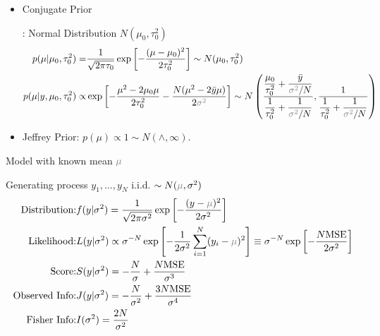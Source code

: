 \begin{itemize}[topsep=2pt,itemsep=0pt]
    \item \hypertarget{NormalWithVarConjugate}{Conjugate Prior}: Normal Distribution $ N(\mu _0,\tau_0^2) $
    \begin{align*}
        p(\mu |\mu _0,\tau_0^2)=&\dfrac{ 1 }{ \sqrt{2\pi\tau_0} }\exp\left[ -\dfrac{ (\mu -\mu _0)^2 }{ 2\tau_0^2 }  \right]\sim N(\mu _0,\tau_0^2) \\
        p(\mu |y,\mu _0,\tau_0^2)\propto&\exp\left[ -\dfrac{ \mu ^2-2\mu _0\mu  }{ 2\tau_0^2 }-\dfrac{ N(\mu ^2-2\bar{y}\mu ) }{ 2\fixed{\sigma ^2} } \right]\sim N\left( \dfrac{ \dfrac{ \mu _0 }{ \tau_0^2 } + \dfrac{ \bar{y} }{ \fixed{\sigma ^2}/N }  }{ \dfrac{ 1 }{ \tau_0^2 } + \dfrac{ 1 }{ \fixed{\sigma ^2}/N } }  ,  \dfrac{ 1  }{ \dfrac{ 1 }{ \tau_0^2 } + \dfrac{ 1 }{ \fixed{\sigma ^2}/N } } \right)
    \end{align*}

    \item Jeffrey Prior: $ p(\mu  )\propto 1\sim N(\wedge, \infty) $.
\end{itemize}



\begin{point}
    Model with known mean $ \fixed{\mu} $
\end{point}

Generating process $ y_1,\ldots,y_N $ i.i.d. $ \sim N(\fixed{\mu} ,\sigma ^2) $
\begin{align*}
    \text{Distribution:}&f(y|\sigma ^2  )=\dfrac{1}{\sqrt{2\pi\sigma ^2}}\exp\left[ -\dfrac{(y-\fixed{\mu} )^2}{2\sigma ^2} \right]\\
    \text{Likelihood:}&L(y|\sigma ^2)\propto \sigma^{-N} \exp\left[ -\dfrac{1}{2\sigma ^2}\sum_{i=1}^N (y_i-\fixed{\mu})^2 \right]\equiv \sigma^{-N} \exp\left[ -\dfrac{N\mathrm{MSE}}{2\sigma ^2}   \right] \\
    \text{Score:}&S(y|\sigma ^2)= -\dfrac{N}{\sigma }+\dfrac{N\mathrm{MSE} }{\sigma ^3}\\
    \text{Observed Info:}&J(y|\sigma ^2)= -\dfrac{N}{\sigma ^2}+\dfrac{3N\mathrm{MSE} }{\sigma ^4}\\
    \text{Fisher Info:}&I(\sigma^2 )=\dfrac{2N}{\sigma ^2}
\end{align*}

